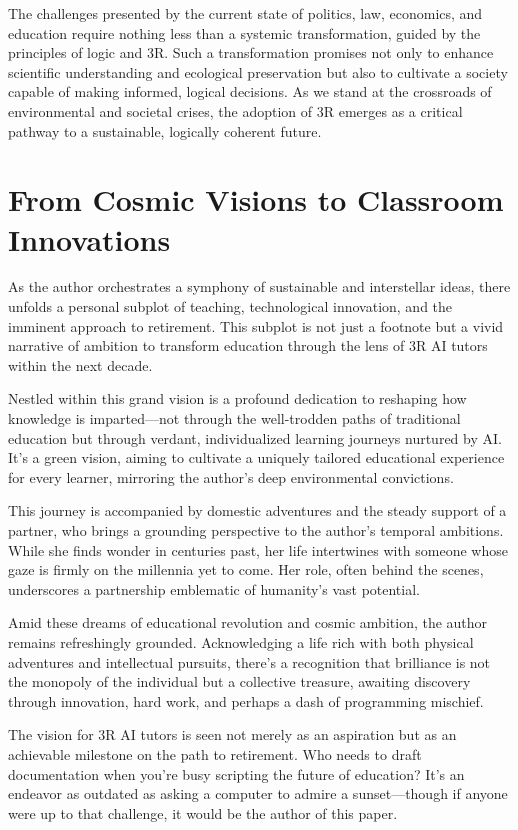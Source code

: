 \documentclass[12pt]{article}
\begin{document}
The challenges presented by the current state of politics, law, economics, and education require nothing less than a systemic transformation, guided by the principles of logic and 3R. Such a transformation promises not only to enhance scientific understanding and ecological preservation but also to cultivate a society capable of making informed, logical decisions. As we stand at the crossroads of environmental and societal crises, the adoption of 3R emerges as a critical pathway to a sustainable, logically coherent future.

\section*{From Cosmic Visions to Classroom Innovations}

As the author orchestrates a symphony of sustainable and interstellar ideas, there unfolds a personal subplot of teaching, technological innovation, and the imminent approach to retirement. This subplot is not just a footnote but a vivid narrative of ambition to transform education through the lens of 3R AI tutors within the next decade.

Nestled within this grand vision is a profound dedication to reshaping how knowledge is imparted—not through the well-trodden paths of traditional education but through verdant, individualized learning journeys nurtured by AI. It's a green vision, aiming to cultivate a uniquely tailored educational experience for every learner, mirroring the author's deep environmental convictions.

This journey is accompanied by domestic adventures and the steady support of a partner, who brings a grounding perspective to the author's temporal ambitions. While she finds wonder in centuries past, her life intertwines with someone whose gaze is firmly on the millennia yet to come. Her role, often behind the scenes, underscores a partnership emblematic of humanity’s vast potential.

Amid these dreams of educational revolution and cosmic ambition, the author remains refreshingly grounded. Acknowledging a life rich with both physical adventures and intellectual pursuits, there's a recognition that brilliance is not the monopoly of the individual but a collective treasure, awaiting discovery through innovation, hard work, and perhaps a dash of programming mischief.

The vision for 3R AI tutors is seen not merely as an aspiration but as an achievable milestone on the path to retirement. Who needs to draft documentation when you’re busy scripting the future of education? It’s an endeavor as outdated as asking a computer to admire a sunset—though if anyone were up to that challenge, it would be the author of this paper.
\end{document}
